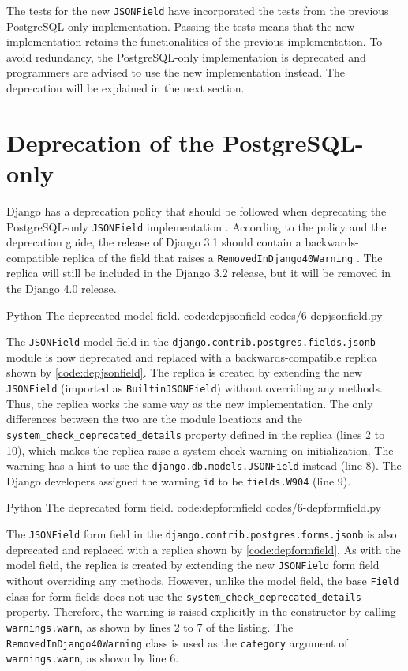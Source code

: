 The tests for the new \verb|JSONField| have incorporated the tests from the
previous PostgreSQL-only implementation. Passing the tests means that the new
implementation retains the functionalities of the previous implementation.
To avoid redundancy, the PostgreSQL-only implementation is deprecated and
programmers are advised to use the new implementation instead. The deprecation
will be explained in the next section.

\section{Deprecation of the PostgreSQL-only }

Django has a deprecation policy that should be followed when deprecating the
PostgreSQL-only \verb|JSONField| implementation
\cite{django:deprecation-policy}. According to the policy and the deprecation
guide, the release of Django 3.1 should contain a backwards-compatible replica
of the field that raises a \verb|RemovedInDjango40Warning|
\cite{django:deprecation-guide}. The replica will still be included in the
Django 3.2 release, but it will be removed in the Django 4.0 release.

\listing
{Python}
{The deprecated  model field.}
{code:depjsonfield}
{codes/6-depjsonfield.py}

The \verb|JSONField| model field in the
\verb|django.contrib.postgres.fields.jsonb| module is now deprecated and
replaced with a backwards-compatible replica shown by
\autoref{code:depjsonfield}. The replica is created by extending the new
\verb|JSONField| (imported as \verb|BuiltinJSONField|) without overriding any
methods. Thus, the replica works the same way as the new implementation. The
only differences between the two are the module locations and the
\verb|system_check_deprecated_details| property defined in the replica (lines 2
to 10), which makes the replica raise a system check warning on initialization.
The warning has a hint to use the \verb|django.db.models.JSONField| instead
(line 8). The Django developers assigned the warning \verb|id| to be
\verb|fields.W904| (line 9).

\listing
{Python}
{The deprecated  form field.}
{code:depformfield}
{codes/6-depformfield.py}

The \verb|JSONField| form field in the
\verb|django.contrib.postgres.forms.jsonb| is also deprecated and replaced with
a replica shown by \autoref{code:depformfield}. As with the model field, the
replica is created by extending the new \verb|JSONField| form field without
overriding any methods. However, unlike the model field, the base \verb|Field|
class for form fields does not use the \verb|system_check_deprecated_details|
property. Therefore, the warning is raised explicitly in the constructor by
calling \verb|warnings.warn|, as shown by lines 2 to 7 of the listing. The
\verb|RemovedInDjango40Warning| class is used as the \verb|category| argument
of \verb|warnings.warn|, as shown by line 6.

